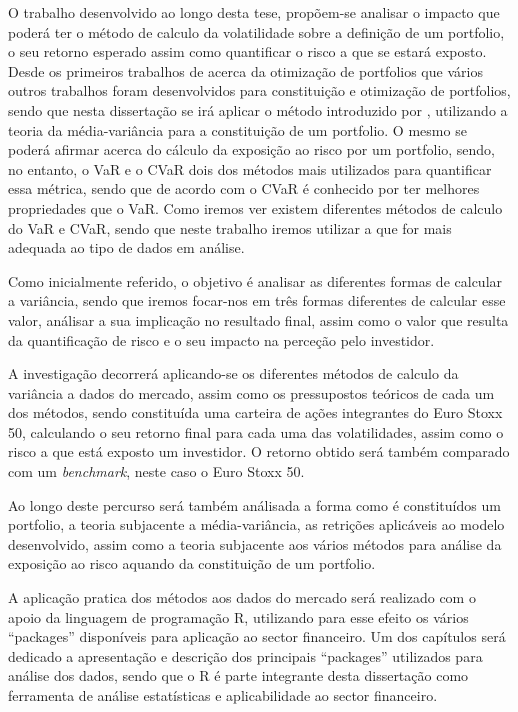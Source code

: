 \documentclass[
  12pt,
  a4paper,
  openany]{book}
\begin{document}
O trabalho desenvolvido ao longo desta tese, propõem-se analisar o impacto que poderá ter o método de calculo da volatilidade sobre a definição de um portfolio, o seu retorno esperado assim como quantificar o risco a que se estará exposto. Desde os primeiros trabalhos de \citet{Markowitz1952} acerca da otimização de portfolios que vários outros trabalhos foram desenvolvidos para constituição e otimização de portfolios, sendo que nesta dissertação se irá aplicar o método introduzido por \citet{Markowitz1952}, utilizando a teoria da média-variância para a constituição de um portfolio. O mesmo se poderá afirmar acerca do cálculo da exposição ao risco por um portfolio, sendo, no entanto, o VaR e o CVaR dois dos métodos mais utilizados para quantificar essa métrica, sendo que de acordo com \citet{OptVaR2000} o CVaR é conhecido por ter melhores propriedades que o VaR. Como iremos ver existem diferentes métodos de calculo do VaR e CVaR, sendo que neste trabalho iremos utilizar a que for mais adequada ao tipo de dados em análise.

Como inicialmente referido, o objetivo é analisar as diferentes formas de calcular a variância, sendo que iremos focar-nos em três formas diferentes de calcular esse valor, análisar a sua implicação no resultado final, assim como o valor que resulta da quantificação de risco e o seu impacto na perceção pelo investidor.

A investigação decorrerá aplicando-se os diferentes métodos de calculo da variância a dados do mercado, assim como os pressupostos teóricos de cada um dos métodos, sendo constituída uma carteira de ações integrantes do Euro Stoxx 50, calculando o seu retorno final para cada uma das volatilidades, assim como o risco a que está exposto um investidor. O retorno obtido será também comparado com um \emph{benchmark}, neste caso o Euro Stoxx 50.

Ao longo deste percurso será também análisada a forma como é constituídos um portfolio, a teoria subjacente a média-variância, as retrições aplicáveis ao modelo desenvolvido, assim como a teoria subjacente aos vários métodos para análise da exposição ao risco aquando da constituição de um portfolio.

A aplicação pratica dos métodos aos dados do mercado será realizado com o apoio da linguagem de programação R, utilizando para esse efeito os vários ``packages'' disponíveis para aplicação ao sector financeiro. Um dos capítulos será dedicado a apresentação e descrição dos principais ``packages'' utilizados para análise dos dados, sendo que o R é parte integrante desta dissertação como ferramenta de análise estatísticas e aplicabilidade ao sector financeiro.
\end{document}
